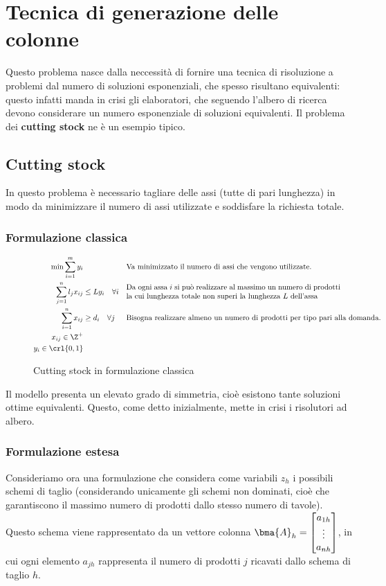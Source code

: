 \documentclass[\main/main.tex]{subfiles}
\begin{document}
\chapter{Tecnica di generazione delle colonne}
Questo problema nasce dalla neccessità di fornire una tecnica di risoluzione a problemi dal numero di soluzioni esponenziali, che spesso risultano equivalenti: questo infatti manda in crisi gli elaboratori, che seguendo l'albero di ricerca devono considerare un numero esponenziale di soluzioni equivalenti. Il problema dei \textbf{cutting stock} ne è un esempio tipico.

\section{Cutting stock}
In questo problema è necessario tagliare delle assi (tutte di pari lunghezza) in modo da minimizzare il numero di assi utilizzate e soddisfare la richiesta totale.

\subsection{Formulazione classica}

\begin{figure}
\begin{align*}
    \min \sum_{i=1}^m y_i & && \text{Va minimizzato il numero di assi che vengono utilizzate.}\\
    \sum_{j=1}^n l_j x_{ij} &\leq L y_i \quad \forall i &&\parbox{10cm}{Da ogni assa \(i\) si può realizzare al massimo un numero di prodotti la cui lunghezza totale non superi la lunghezza \(L\) dell'assa}\\
    \sum_{i=1}^n x_{ij} &\geq d_i \quad \forall j &&\text{Bisogna realizzare almeno un numero di prodotti per tipo pari alla domanda.}\\
    x_{ij} \in \Z^+\\
    y_i \in \crl{0,1}\\
\end{align*}
\caption{Cutting stock in formulazione classica}
\end{figure}

Il modello presenta un elevato grado di simmetria, cioè esistono tante soluzioni ottime equivalenti. Questo, come detto inizialmente, mette in crisi i risolutori ad albero.

\subsection{Formulazione estesa}
Consideriamo ora una formulazione che considera come variabili \(z_h\) i possibili schemi di taglio (considerando unicamente gli schemi non dominati, cioè che garantiscono il massimo numero di prodotti dallo stesso numero di tavole). Questo schema viene rappresentato da un vettore colonna \(\bma{A}_h = \begin{bmatrix}
    a_{1h}\\
    \vdots \\
    a_{nh}
\end{bmatrix}\), in cui ogni elemento \(a_{jh}\) rappresenta il numero di prodotti \(j\) ricavati dallo schema di taglio \(h\).
\end{document}
